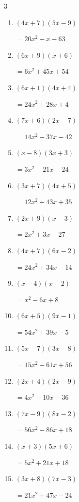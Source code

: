 \begin{multicols}{3}
\begin{enumerate}
        $=32x^{2}+12x-5$

\columnbreak %

  \item $(4x+7)(5x-9)$

        $=20x^{2}-x-63$

  \item $(6x+9)(x+6)$

        $=6x^{2}+45x+54$

  \item $(6x+1)(4x+4)$

        $=24x^{2}+28x+4$

  \item $(7x+6)(2x-7)$

        $=14x^{2}-37x-42$

  \item $(x-8)(3x+3)$

        $=3x^{2}-21x-24$

  \item $(3x+7)(4x+5)$

        $=12x^{2}+43x+35$

  \item $(2x+9)(x-3)$

        $=2x^{2}+3x-27$

  \item $(4x+7)(6x-2)$

        $=24x^{2}+34x-14$

  \item $(x-4)(x-2)$

        $=x^{2}-6x+8$

  \item $(6x+5)(9x-1)$

        $=54x^{2}+39x-5$

  \item $(5x-7)(3x-8)$

        $=15x^{2}-61x+56$

  \item $(2x+4)(2x-9)$

        $=4x^{2}-10x-36$

  \item $(7x-9)(8x-2)$

        $=56x^{2}-86x+18$

  \item $(x+3)(5x+6)$

        $=5x^{2}+21x+18$

  \item $(3x+8)(7x-3)$

        $=21x^{2}+47x-24$

\end{enumerate}
\end{multicols}
